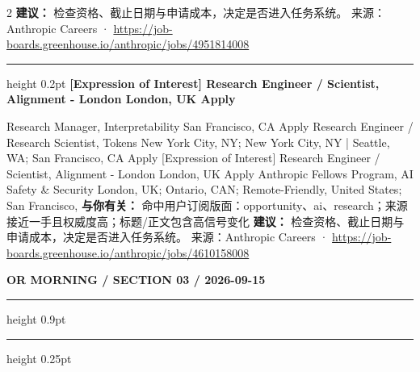 \documentclass[10.5pt]{ctexart}
\begin{document}
\begin{multicols}{2}
\textbf{建议：} 检查资格、截止日期与申请成本，决定是否进入任务系统。
{\footnotesize\color{ormuted} 来源：Anthropic Careers · \url{https://job-boards.greenhouse.io/anthropic/jobs/4951814008}}
\vspace{2mm}
\hrule height 0.2pt
\vspace{2mm}
{\large\bfseries [Expression of Interest] Research Engineer / Scientist, Alignment - London London, UK Apply}\par
[Expression of Interest] Research Manager, Interpretability San Francisco, CA Apply Research Engineer / Research Scientist, Tokens New York City, NY; New York City, NY | Seattle, WA; San Francisco, CA Apply [Expression of Interest] Research Engineer / Scientist, Alignment - London London, UK Apply Anthropic Fellows Program, AI Safety \& Security London, UK; Ontario, CAN; Remote-Friendly, United States; San Francisco, 
\textbf{与你有关：} 命中用户订阅版面：opportunity、ai、research；来源接近一手且权威度高；标题/正文包含高信号变化
\textbf{建议：} 检查资格、截止日期与申请成本，决定是否进入任务系统。
{\footnotesize\color{ormuted} 来源：Anthropic Careers · \url{https://job-boards.greenhouse.io/anthropic/jobs/4610158008}}
\end{multicols}
\newpage
{\small\bfseries OR MORNING / SECTION 03 / 2026-09-15}
\vspace{2mm}
\hrule height 0.9pt
\vspace{1.5mm}
\hrule height 0.25pt
\vspace{4mm}
\end{document}
